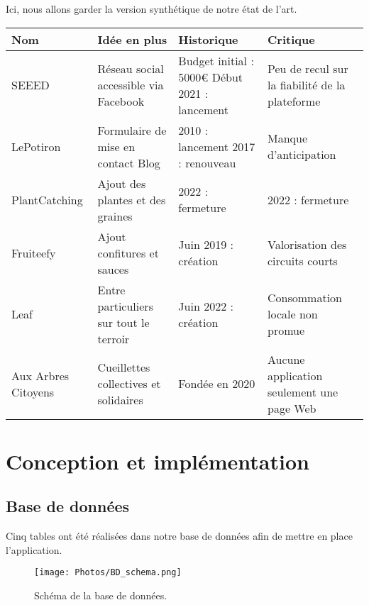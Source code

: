 \documentclass{article}
\begin{document}
Ici, nous allons garder la version synthétique de notre état de l'art.
\begin{center}
    \begin{tabular}{|p{2cm}|p{3cm}|p{3cm}|p{3cm}|}
    \hline
        Nom & Idée en plus & Historique & Critique \\
    \hline
        SEEED & Réseau social accessible via Facebook & Budget initial : 5000€
 Début 2021 : lancement & Peu de recul sur la fiabilité de la plateforme \\
    \hline
        LePotiron & Formulaire de mise en contact 
 Blog & 2010 : lancement
 2017 : renouveau & Manque d’anticipation \\
    \hline
        PlantCatching & Ajout des plantes et des graines & 2022 : fermeture & 2022 : fermeture \\
    \hline
        Fruiteefy & Ajout confitures et sauces & Juin 2019 : création & Valorisation des circuits courts \\
    \hline
        Leaf & Entre particuliers sur tout le terroir & Juin 2022 : création & Consommation locale non promue \\
    \hline
        Aux Arbres Citoyens & Cueillettes collectives et solidaires & Fondée en 2020 & Aucune application seulement une page Web \\
    \hline
    \end{tabular}
\end{center}



\newpage
\section{Conception et implémentation}
\subsection{Base de données}

Cinq tables ont été réalisées dans notre base de données afin de mettre en place l'application. 

\begin{figure}[h!]
    \centering
    \texttt{[image: Photos/BD\_schema.png]}
    \caption{Schéma de la base de données.}
    \label{fig:my_label}
\end{figure}
\end{document}
